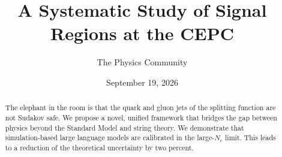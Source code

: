 \documentclass[11pt]{article}
\title{A Systematic Study of Signal Regions at the CEPC}
\author{The Physics Community}
\date{September 19, 2026}
\numberwithin{equation}{section}
\theoremstyle{definition}
\theoremstyle{remark}
\begin{document}
\maketitle
\begin{abstract}
The elephant in the room is that the quark and gluon jets of the
splitting function are not Sudakov safe. We propose a novel, unified
framework that bridges the gap between physics beyond the Standard Model
and string theory. We demonstrate that simulation-based large language
models are calibrated in the large-$N_c$ limit. This leads to a
reduction of the theoretical uncertainty by two percent.
\end{abstract}
\tableofcontents



\nocite{*}


\end{document}

